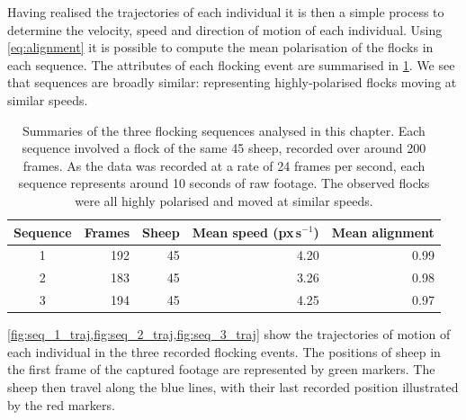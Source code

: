 Having realised the trajectories of each individual it is then a simple process
to determine the velocity, speed and direction of motion of each individual.
Using \cref{eq:alignment} it is possible to compute the mean polarisation of
the flocks in each sequence. The attributes of each flocking event are
summarised in \cref{tab:data_summary}. We see that sequences are broadly
similar: representing highly-polarised flocks moving at similar speeds.

\begin{table}[tbp]
\begin{tabular}{@{}crrrr@{}}
\toprule
Sequence & Frames & Sheep & Mean speed (px\,s$^{-1}$) & Mean alignment \\
\midrule
1 &    192 &     45 &      4.20 &          0.99 \\
2 &    183 &     45 &      3.26 &          0.98 \\
3 &    194 &     45 &      4.25 &          0.97 \\
\bottomrule
\end{tabular}
\caption{Summaries of the three flocking sequences analysed in this chapter.
  Each sequence involved a flock of the same 45 sheep, recorded over
  around 200 frames. As the data was recorded at a rate of 24 frames per
  second, each sequence represents around 10 seconds of raw footage. The
  observed flocks were all highly polarised and moved at similar speeds.}
\label{tab:data_summary}
\end{table}

\cref{fig:seq_1_traj,fig:seq_2_traj,fig:seq_3_traj} show the trajectories of
motion of each individual in the three recorded flocking events. The positions
of sheep in the first frame of the captured footage are represented by green 
markers. The sheep then travel along the blue lines, with their last recorded
position illustrated by the red markers.

